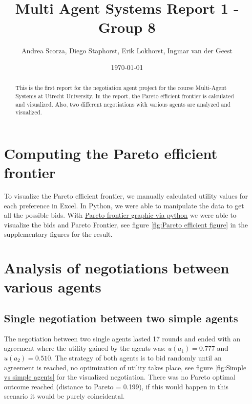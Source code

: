 \documentclass[a4paper]{article}
\title{\vspace{-5em}Multi Agent Systems Report 1 - Group 8}
\date{\today}
\author{Andrea Scorza, Diego Staphorst, Erik Lokhorst, Ingmar van der Geest}
\begin{document}
\maketitle

\begin{abstract}
This is the first report for the negotiation agent project for the course Multi-Agent Systems at Utrecht University. In the report, the Pareto efficient frontier is calculated and visualized. Also, two different negotiations with various agents are analyzed and visualized. 
\end{abstract}

\section{Computing the Pareto efficient frontier}
To visualize the Pareto efficient frontier, we manually calculated utility values for each preference in Excel. In Python, we were able to manipulate the data to get all the possible bids. With \href{https://sirinnes.wordpress.com/2013/04/25/pareto-frontier-graphic-via-python/}{Pareto frontier graphic via python} we were able to visualize the bids and Pareto Frontier, see figure \ref{fig:Pareto efficient figure} in the supplementary figures for the result.
\section{Analysis of negotiations between various agents}

\subsection{Single negotiation between two simple agents}
The negotiation between two single agents lasted 17 rounds and ended with an agreement where the utility gained by the agents was: $u(a_1) = 0.777$ and $u(a_2) = 0.510$. The strategy of both agents is to bid randomly until an agreement is reached, no optimization of utility takes place, see figure \ref{fig:Simple vs simple agents} for the visualized negotiation. There was no Pareto optimal outcome reached (distance to Pareto = 0.199), if this would happen in this scenario it would be purely coincidental.
\end{document}
